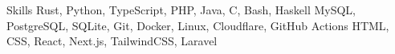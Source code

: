 
\begin{rubric}{Skills}
	Rust, Python, TypeScript, PHP, Java, C, Bash, Haskell
	MySQL, PostgreSQL, SQLite, Git, Docker, Linux, Cloudflare, GitHub Actions
\entry*[Web]
	HTML, CSS, React, Next.js, TailwindCSS, Laravel
\end{rubric}
